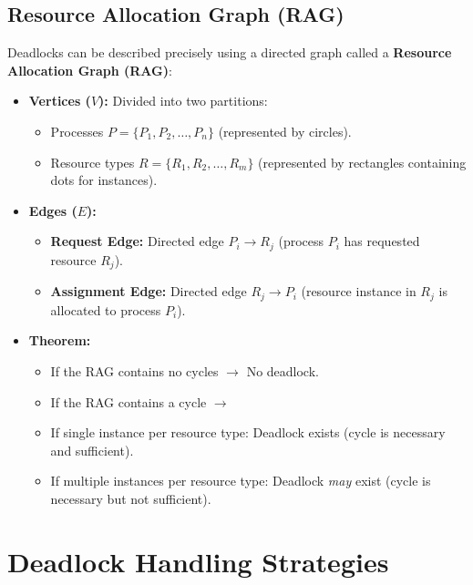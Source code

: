 \documentclass[12pt,a4paper]{article}
\begin{document}
\subsection{Resource Allocation Graph (RAG)}
Deadlocks can be described precisely using a directed graph called a \textbf{Resource Allocation Graph (RAG)}:
\begin{itemize}[leftmargin=*, itemsep=3pt]
  \item \textbf{Vertices ($V$):} Divided into two partitions:
  \begin{itemize}[leftmargin=*, itemsep=2.5pt, topsep=0pt]
    \item Processes $P = \{P_1, P_2, \dots, P_n\}$ (represented by circles).
    \item Resource types $R = \{R_1, R_2, \dots, R_m\}$ (represented by rectangles containing dots for instances).
  \end{itemize}
  \item \textbf{Edges ($E$):}
  \begin{itemize}[leftmargin=*, itemsep=2.5pt, topsep=0pt]
    \item \textbf{Request Edge:} Directed edge $P_i \to R_j$ (process $P_i$ has requested resource $R_j$).
    \item \textbf{Assignment Edge:} Directed edge $R_j \to P_i$ (resource instance in $R_j$ is allocated to process $P_i$).
    \end{itemize}
  \end{itemize}

\begin{itemize}[leftmargin=*, itemsep=3pt]
  \item \textbf{Theorem:}
  \begin{itemize}[leftmargin=*, itemsep=2.5pt, topsep=0pt]
    \item If the RAG contains no cycles $\to$ No deadlock.
    \item If the RAG contains a cycle $\to$
      \item If single instance per resource type: Deadlock exists (cycle is necessary and sufficient).
      \item If multiple instances per resource type: Deadlock \textit{may} exist (cycle is necessary but not sufficient).
    \end{itemize}
  \end{itemize}

\section{Deadlock Handling Strategies}
\end{document}
